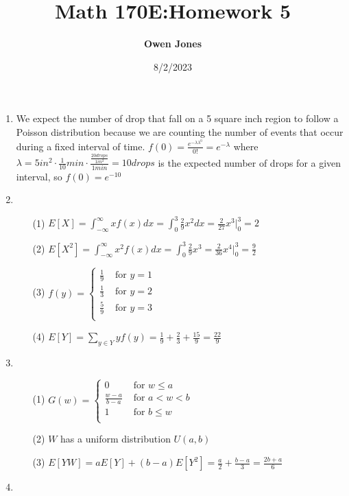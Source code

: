\documentclass{article}
\title{\bf Math 170E:\@ Homework 5}
\date{8/2/2023}
\author{\bf Owen Jones}
\begin{document}
\maketitle

\begin{enumerate}[label=\textbf{Problem \arabic*.}]
\item We expect the number of drop that fall on a 5 square inch region to follow a Poisson distribution because we are counting the number of events that occur during a fixed interval of time.
$f(0)=\frac{e^{-\lambda \lambda^0}}{0!}=e^{-\lambda}$ where $\lambda=5in^2\cdot\frac{1}{10} min\cdot\frac{\frac{20drops}{1in^2}}{1 min}=10drops$ is the expected number of drops for a given interval, so $f(0)=e^{-10}$ 
\item \begin{itemize}
    \item [(1)] $E[X]=\int_{-\infty}^{\infty}xf(x)dx=\int_{0}^{3}\frac{2}{9}x^2dx=\frac{2}{27}x^3|_0^3=2$
    \item [(2)] $E[X^2]=\int_{-\infty}^{\infty}x^2f(x)dx=\int_{0}^{3}\frac{2}{9}x^3=\frac{2}{36}x^4|_0^3=\frac{9}{2}$
    \item [(3)] $f(y)=\begin{cases}
        \frac{1}{9} & \text{ for } y=1\\
        \frac{1}{3} & \text{ for } y=2\\
         \frac{5}{9} & \text{ for } y=3\\
    \end{cases}$
    \item [(4)] $\displaystyle E[Y]=\sum_{y\in Y}yf(y)=\frac{1}{9}+\frac{2}{3}+\frac{15}{9}=\frac{22}{9}$
\end{itemize}
\item \begin{itemize}
    \item [(1)] $G(w)=\begin{cases}
        0 & \text{ for } w\le a\\
        \frac{w-a}{b-a} & \text{ for } a<w<b\\
        1 & \text{ for } b\le w\\
    \end{cases}$
    \item [(2)] $W$ has a uniform distribution $U(a,b)$
    \item [(3)] $E[YW]=aE[Y]+(b-a)E[Y^2]=\frac{a}{2}+\frac{b-a}{3}=\frac{2b+a}{6}$    
\end{itemize}
\item \begin{itemize}

\end{itemize}
\end{enumerate}
\end{document}
